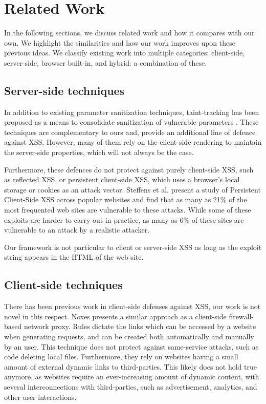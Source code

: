 \section{Related Work}
In the following sections, we discuss related work and how it compares with our own. We highlight the similarities and how our work improves upon these previous ideas. We classify existing work into multiple categories: client-side, server-side, browser built-in, and hybrid: a combination of these.

\subsection{Server-side techniques} In addition to existing parameter sanitization techniques, taint-tracking has been proposed as a means to consolidate sanitization of vulnerable parameters \cite{Xu:2006:TPE:1267336.1267345,DBLP:conf/sec/Nguyen-TuongGGSE05,Pietraszek:2005:DAI:2146257.2146267,Bisht:2008:XPD:1428322.1428325}. These techniques are complementary to ours and, provide an additional line of defence against XSS. However, many of them rely on the client-side rendering to maintain the server-side properties, which will not always be the case.

Furthermore, these defences do not protect against purely client-side XSS, such as reflected XSS, or persistent client-side XSS, which uses a browser's local storage or cookies as an attack vector. Steffens et al. \cite{DBLP:conf/ndss/SteffensRJS19} present a study of Persistent Client-Side XSS across popular websites and find that as many as 21\% of the most frequented web sites are vulnerable to these attacks.  While some of these exploits are harder to carry out in practice, as many as 6\% of these sites are vulnerable to an attack by a realistic attacker.

Our framework is not particular to client or server-side XSS as long as the exploit string appears in the HTML of the web site.

\subsection{Client-side techniques} There has been previous work in client-side defenses against XSS, our work is not novel in this respect. Noxes \cite{Kirda:2009:CCS:2639535.2639808} presents a similar approach as a client-side firewall-based network proxy. Rules dictate the links which can be accessed by a website when generating requests, and can be created both automatically and manually by an user. This technique does not protect against same-service attacks, such as code deleting local files. Furthermore, they rely on websites having a small amount of external dynamic links to third-parties. This likely does not hold true anymore, as websites require an ever-increasing amount of dynamic content, with several interconnections with third-parties, such as advertisement, analytics, and other user interactions.

